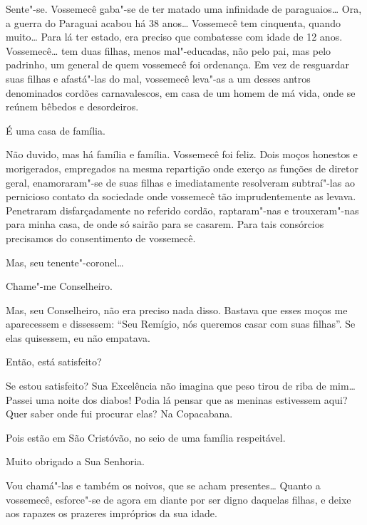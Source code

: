  Sente"-se.   Vossemecê gaba"-se de
ter matado uma infinidade de paraguaios\ldots{} Ora, a guerra do Paraguai acabou há
38 anos\ldots{} Vossemecê tem cinquenta, quando muito\ldots{} Para lá ter
estado, era preciso que combatesse com idade de 12 anos.   Vossemecê\ldots{} tem duas filhas, menos mal"-educadas, não pelo
pai, mas pelo padrinho, um general de quem vossemecê foi ordenança. Em vez de
resguardar suas filhas e afastá"-las do mal, vossemecê leva"-as a um desses antros
denominados cordões carnavalescos, em casa de um homem de má vida, onde se
reúnem bêbedos e desordeiros.

 É uma casa de família.

 Não duvido, mas há família e família.   Vossemecê foi feliz. Dois moços honestos e morigerados,
empregados na mesma repartição onde exerço as funções de diretor geral,
enamoraram"-se de suas filhas e imediatamente resolveram subtraí"-las ao
pernicioso contato da sociedade onde vossemecê tão imprudentemente as levava.
Penetraram disfarçadamente no referido cordão, raptaram"-nas e trouxeram"-nas para
minha casa, de onde só sairão para se casarem. Para tais consórcios precisamos
do consentimento de vossemecê.

  Mas, seu
tenente"-coronel\ldots{}

 Chame"-me Conselheiro.

 Mas, seu Conselheiro, não era preciso nada disso. Bastava que
esses moços me aparecessem e dissessem: ``Seu Remígio, nós queremos
casar com suas filhas''. Se elas quisessem, eu não empatava.

 Então, está satisfeito?

 Se estou satisfeito? Sua Excelência não imagina que peso
tirou de riba de mim\ldots{} Passei uma noite dos diabos! Podia lá pensar que as
meninas estivessem aqui? Quer saber onde fui procurar elas? Na Copacabana.

 Pois estão em São Cristóvão, no seio de uma família respeitável.

 Muito obrigado a Sua Senhoria.

 Vou chamá"-las e também os noivos, que se acham presentes\ldots{}
 Quanto a vossemecê,
esforce"-se de agora em diante por ser digno daquelas filhas, e deixe aos rapazes
os prazeres impróprios da sua idade.  


